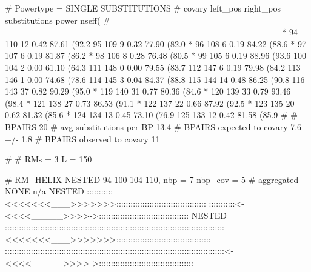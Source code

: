 \begin{sreoutput}
# Powertype = SINGLE SUBSTITUTIONS
# covary  left_pos      right_pos    substitutions      power   nseff(%
#-------------------------------------------------------------------------------------------------
     *    94            110             12              0.42    87.61 (92.2%
          95            109             9               0.32    77.90 (82.0%
     *    96            108             6               0.19    84.22 (88.6%
     *    97            107             6               0.19    81.87 (86.2%
     *    98            106             8               0.28    76.48 (80.5%
     *    99            105             6               0.19    88.96 (93.6%
          100           104             2               0.00    61.10 (64.3%
          111           148             0               0.00    79.55 (83.7%
          112           147             6               0.19    79.98 (84.2%
          113           146             1               0.00    74.68 (78.6%
          114           145             3               0.04    84.37 (88.8%
          115           144             14              0.48    86.25 (90.8%
          116           143             37              0.82    90.29 (95.0%
     *    119           140             31              0.77    80.36 (84.6%
     *    120           139             33              0.79    93.46 (98.4%
     *    121           138             27              0.73    86.53 (91.1%
     *    122           137             22              0.66    87.92 (92.5%
     *    123           135             20              0.62    81.32 (85.6%
     *    124           134             13              0.45    73.10 (76.9%
          125           133             12              0.42    81.58 (85.9%
#
# BPAIRS 20
# avg substitutions per BP  13.4
# BPAIRS expected to covary 7.6 +/- 1.8
# BPAIRS observed to covary 11

#
# RMs = 3 L = 150

# RM_HELIX NESTED 94-100 104-110, nbp = 7 nbp_cov = 5
# aggregated NONE
n/a
NESTED  :::::::::::<<<<<<<___>>>>>>>::::::::::::::::::::::::::::::::::::::
        :::::::::::<-<<<<_____>>>>->::::::::::::::::::::::::::::::::::::::
NESTED  :::::::::::::::::::::::::::::::::::::::::::::::::::::::::::::::::::::::::::::::::::::::::::::<<<<<<<___>>>>>>>::::::::::::::::::::::::::::::::::::::::
        :::::::::::::::::::::::::::::::::::::::::::::::::::::::::::::::::::::::::::::::::::::::::::::<-<<<<_____>>>>->::::::::::::::::::::::::::::::::::::::::


\end{sreoutput}

